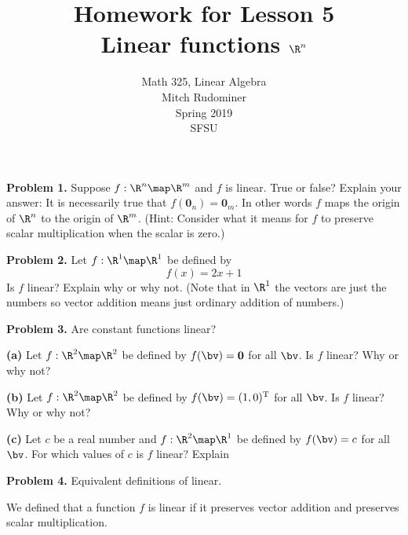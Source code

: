 \documentclass[oneside,12pt]{amsart}
\begin{document}
\title{Homework for Lesson 5 \\ Linear functions $\R^n$}
\author{Math 325, Linear Algebra \\ Mitch Rudominer \\ Spring 2019 \\ SFSU }
\date{}

\maketitle

\textbf{Problem 1.} Suppose $f:\R^n\map\R^m$ and $f$ is linear.
True or false? Explain your answer:
It is necessarily true that $f(\mathbf{0}_n) = \mathbf{0}_m$.
In other words $f$ maps the origin of $\R^n$ to the origin of $\R^m$.
(Hint: Consider what it means for $f$ to preserve scalar multiplication when
the scalar is zero.)

\bigskip
\bigskip
\bigskip
\bigskip
\bigskip
\bigskip

\textbf{Problem 2.} Let $f:\R^1\map\R^1$ be defined by
$$f(x) = 2x+1$$
Is $f$ linear? Explain why or why not. (Note that in $\R^1$ the vectors are
just the numbers so vector addition means just ordinary addition of numbers.)

\bigskip
\bigskip
\bigskip
\bigskip
\bigskip
\bigskip

\textbf{Problem 3.} Are constant functions linear?

\smallskip

\textbf{(a)} Let $f:\R^{2}\map\R^2$ be defined by $f(\bv) = \textbf{0}$ for
all $\bv$. Is $f$ linear? Why or why not?

\bigskip
\bigskip
\bigskip
\bigskip
\bigskip
\bigskip

\textbf{(b)} Let $f:\R^{2}\map\R^2$ be defined by $f(\bv) = (1,0)^{\text{T}}$ for
all $\bv$. Is $f$ linear? Why or why not?

\bigskip
\bigskip
\bigskip
\bigskip
\bigskip
\bigskip

\textbf{(c)} Let $c$ be a real number and
$f:\R^{2}\map\R^1$ be defined by $f(\bv) = c$ for
all $\bv$. For which values of $c$ is $f$ linear? Explain

\bigskip
\bigskip
\bigskip
\bigskip
\bigskip
\bigskip

\textbf{Problem 4.} Equivalent definitions of linear.

\smallskip

We defined
that a function $f$ is linear if it preserves vector addition and
preserves scalar multiplication.
\end{document}
